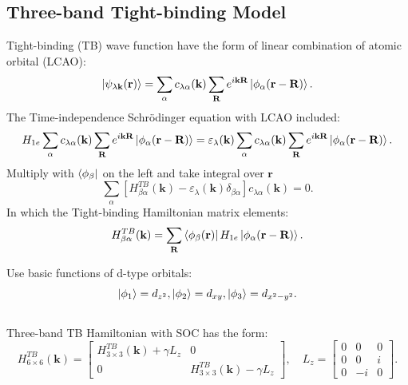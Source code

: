 \documentclass{beamer}
\begin{document}
	\subsection{Three-band Tight-binding Model}
	\begin{frame}
		Tight-binding (TB) wave function have the form of linear combination of atomic orbital (LCAO):
		\begin{equation}
			\ket{\psi_{\lambda \textbf{k}}(\textbf{r})} = \sum_{\alpha} c_{\lambda \alpha} (\textbf{k}) \sum_{\textbf{R}} e^{i\textbf{k}\textbf{R}} \ket{\phi_{\alpha}(\textbf{r}-\textbf{R})}.
		\end{equation}
		The Time-independence Schrödinger equation with LCAO included:
		\begin{equation*}
			H_{1e} \sum_{\alpha} c_{\lambda \alpha} (\textbf{k}) \sum_{\textbf{R}} e^{i\textbf{k}\textbf{R}} \ket{\phi_{\alpha}(\textbf{r}-\textbf{R})} = \varepsilon_{\lambda} (\textbf{k}) \sum_{\alpha} c_{\lambda \alpha} (\textbf{k}) \sum_{\textbf{R}} e^{i\textbf{k}\textbf{R}} \ket{\phi_{\alpha}(\textbf{r}-\textbf{R})}.
		\end{equation*}
		Multiply with $\bra{\phi_{\beta}}$ on the left and take integral over $\textbf{r}$
		\begin{equation}
			\sum_{\alpha} [H^{TB}_{\beta \alpha}(\textbf{k}) - \varepsilon_{\lambda}(\textbf{k})\delta_{\beta\alpha}]c_{\lambda \alpha}(\textbf{k}) = 0.
		\end{equation}
		In which the Tight-binding Hamiltonian matrix elements:
		\begin{equation}
			H^{TB}_{\beta \alpha}(\textbf{k}) = \sum_{\textbf{R}} \bra{\phi_{\beta} (\textbf{r})} H_{1e}\ket{\phi_{\alpha}(\textbf{r}-\textbf{R})}.
		\end{equation}
	\end{frame}
	\begin{frame}
Use basic functions of d-type orbitals: $$\ket{\phi_1} = d_{z^2}, \ket{\phi_2} = d_{xy}, \ket{\phi_3} = d_{x^2- y^2}.$$\\Three-band TB Hamiltonian with SOC has the form:
		\begin{equation*}
			H^{TB}_{6\times 6}(\textbf{k}) = \begin{bmatrix}
				H^{TB}_{3\times 3}(\textbf{k}) + \gamma L_z & 0\\ 0& H^{TB}_{3\times 3}(\textbf{k}) - \gamma L_z
			\end{bmatrix}, \quad L_z= \begin{bmatrix}
			0 & 0 & 0\\
			0 & 0 & i\\
			0 & -i& 0
			\end{bmatrix}.
		\end{equation*}
	\end{frame}
\end{document}
